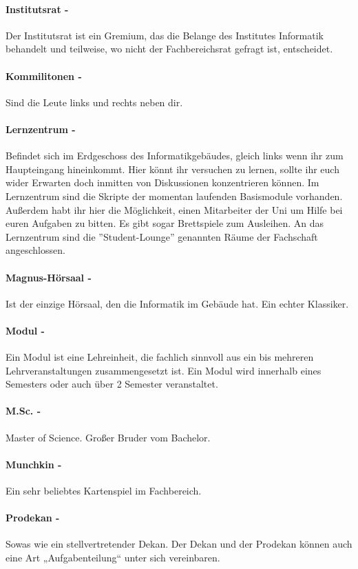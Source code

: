 \paragraph{Institutsrat -} Der Institutsrat ist ein Gremium, das die Belange des Institutes Informatik behandelt und teilweise, wo nicht der Fachbereichsrat gefragt ist, entscheidet.
\paragraph{Kommilitonen -} Sind die Leute links und rechts neben dir.
\paragraph{Lernzentrum -}  Befindet sich im Erdgeschoss des Informatikgebäudes, gleich links wenn ihr zum Haupteingang hineinkommt. Hier könnt ihr versuchen zu lernen, sollte ihr euch wider Erwarten doch inmitten von Diskussionen konzentrieren können. Im Lernzentrum sind die Skripte der momentan laufenden Basismodule vorhanden. Außerdem habt ihr hier die Möglichkeit, einen Mitarbeiter der Uni um Hilfe bei euren Aufgaben zu bitten. Es gibt sogar Brettspiele zum Ausleihen. An das Lernzentrum sind die ''Student-Lounge'' genannten Räume der Fachschaft angeschlossen.
\paragraph{Magnus-Hörsaal -} Ist der einzige Hörsaal, den die Informatik im Gebäude hat. Ein echter Klassiker.
\paragraph{Modul -} Ein Modul ist eine Lehreinheit, die fachlich sinnvoll aus ein bis mehreren Lehrveranstaltungen zusammengesetzt ist. Ein Modul wird innerhalb eines Semesters oder auch über 2 Semester veranstaltet.
\paragraph{M.Sc. -} \glqq Master of Science\grqq . Großer Bruder vom Bachelor.
\paragraph{Munchkin -} Ein sehr beliebtes Kartenspiel im Fachbereich. 
\paragraph{Prodekan -} Sowas wie ein stellvertretender Dekan. Der Dekan und der Prodekan können auch eine Art „Aufgabenteilung“ unter sich vereinbaren.
